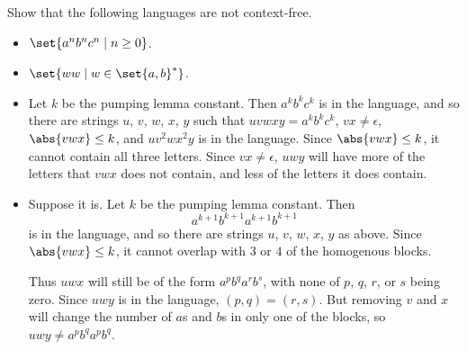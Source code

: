 \begin{exercise}
    Show that the following languages are not context-free.
    \begin{itemize}
        \item $\set{a^n b^n c^n \mid n \ge 0}$.
        \item $\set{ww \mid w \in \set{a, b}^*}$.
    \end{itemize}
\end{exercise}
\begin{solution} \leavevmode
    \begin{itemize}
        \item Let $k$ be the pumping lemma constant.
        Then $a^k b^k c^k$ is in the language, and so there are strings
        $u$, $v$, $w$, $x$, $y$ such that $uvwxy = a^k b^k c^k$, $vx \ne
        \epsilon$, $\abs{vwx} \le k$, and $uv^2wx^2y$ is in the language.
        Since $\abs{vwx} \le k$, it cannot contain all three letters.
        Since $vx \ne \epsilon$, $uwy$ will have more of the letters that
        $vwx$ does not contain, and less of the letters it does contain.
        \item Suppose it is.
        Let $k$ be the pumping lemma constant.
        Then \[
            a^{k+1} b^{k+1} a^{k+1} b^{k+1}
        \] is in the language,
        and so there are strings $u$, $v$, $w$, $x$, $y$ as above.
        Since $\abs{vwx} \le k$, it cannot overlap with $3$ or $4$ of the
        homogenous blocks.

        Thus $uwx$ will still be of the form $a^p b^q a^r b^s$, with
        none of $p$, $q$, $r$, or $s$ being zero.
        Since $uwy$ is in the language, $(p, q) = (r, s)$.
        But removing $v$ and $x$ will change the number of $a$s and $b$s
        in only one of the blocks, so $uwy \ne a^p b^q a^p b^q$.
    \end{itemize}
\end{solution}

